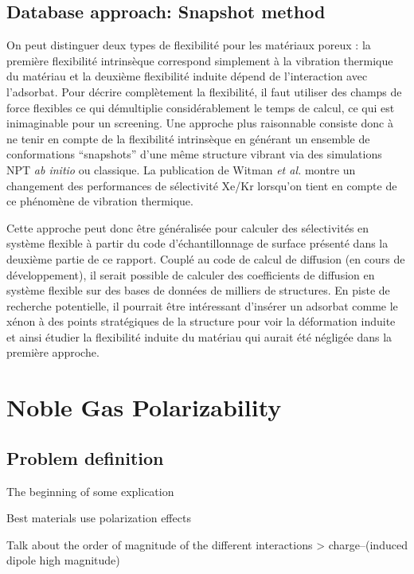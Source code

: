 \documentclass[main]{subfiles}
\begin{document}
\subsection{Database approach: Snapshot method}

On peut distinguer deux types de flexibilité pour les matériaux poreux : la première flexibilité intrinsèque correspond simplement à la vibration thermique du matériau et la deuxième flexibilité induite dépend de l'interaction avec l'adsorbat. Pour décrire complètement la flexibilité, il faut utiliser des champs de force flexibles ce qui démultiplie considérablement le temps de calcul, ce qui est inimaginable pour un screening. Une approche plus raisonnable consiste donc à ne tenir en compte de la flexibilité intrinsèque en générant un ensemble de conformations ``snapshots'' d'une même structure vibrant via des simulations NPT \emph{ab initio} ou classique. La publication de Witman \emph{et al.} montre un changement des performances de sélectivité Xe/Kr lorsqu'on tient en compte de ce phénomène de vibration thermique.\autocite{Witman_2017} 

Cette approche peut donc être généralisée pour calculer des sélectivités en système flexible à partir du code d'échantillonnage de surface présenté dans la deuxième partie de ce rapport. Couplé au code de calcul de diffusion (en cours de développement), il serait possible de calculer des coefficients de diffusion en système flexible sur des bases de données de milliers de structures. En piste de recherche potentielle, il pourrait être intéressant d'insérer un adsorbat comme le xénon à des points stratégiques de la structure pour voir la déformation induite et ainsi étudier la flexibilité induite du matériau qui aurait été négligée dans la première approche. 


\section{Noble Gas Polarizability}

\subsection{Problem definition}


The beginning of some explication

Best materials use polarization effects \autocite{Li_2019,Pei_2022}

Talk about the order of magnitude of the different interactions > charge--(induced dipole high magnitude)
\end{document}

